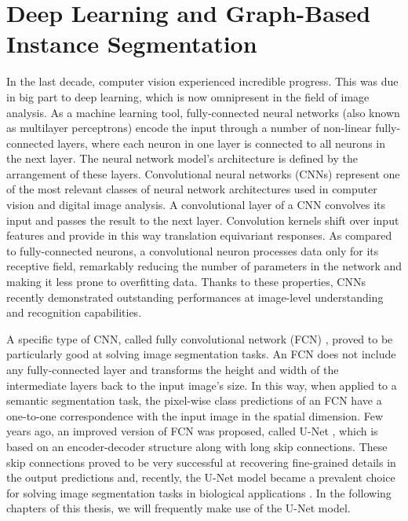 \newpage
\section{Deep Learning and Graph-Based Instance Segmentation}
In the last decade, computer vision experienced incredible progress. This was due in big part to deep learning, which is now omnipresent in the field of image analysis. As a machine learning tool, fully-connected neural networks (also known as multilayer perceptrons) encode the input through a number of non-linear fully-connected layers, where each neuron in one layer is connected to all neurons in the next layer. The neural network model's architecture is defined by the arrangement of these layers. Convolutional neural networks (CNNs) represent one of the most relevant classes of neural network architectures used in computer vision and digital image analysis. A convolutional layer of a CNN convolves its input and passes the result to the next layer. Convolution kernels shift over input features and provide in this way translation equivariant responses. As compared to fully-connected neurons, a convolutional neuron processes data only for its receptive field, remarkably reducing the number of parameters in the network and making it less prone to overfitting data.
Thanks to these properties, CNNs recently demonstrated outstanding performances at image-level understanding and recognition capabilities.

A specific type of CNN, called fully convolutional network (FCN) \cite{long2015fully}, proved to be particularly good at solving image segmentation tasks. An FCN does not include any fully-connected layer and transforms the height and width of the intermediate layers back to the input image's size. 
In this way, when applied to a semantic segmentation task, the pixel-wise class predictions of an FCN have a one-to-one correspondence with the input image in the spatial dimension.
Few years ago, an improved version of FCN was proposed, called U-Net \cite{ronneberger2015u}, which is based on an encoder-decoder structure along with long skip connections. These skip connections proved to be very successful at recovering fine-grained details in the output predictions and, recently, the U-Net model became a prevalent choice for solving image segmentation tasks in biological applications \cite{lee2017superhuman,ronneberger2015u}. In the following chapters of this thesis, we will frequently make use of the U-Net model. 

